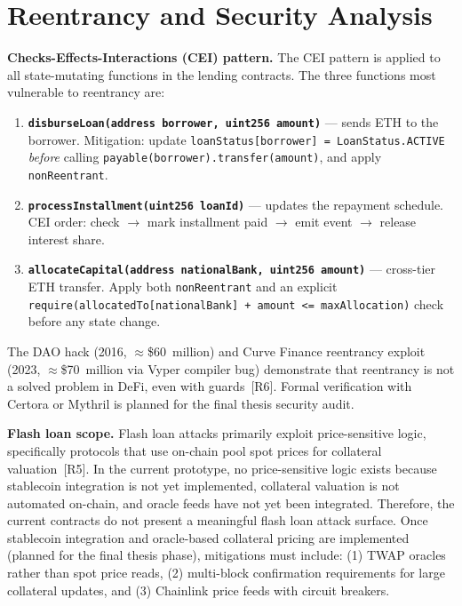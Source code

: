 \documentclass[12pt,a4paper]{report}
\begin{document}
\section{Reentrancy and Security Analysis}

\textbf{Checks-Effects-Interactions (CEI) pattern.} The CEI pattern is applied to all state-mutating functions in the lending contracts. The three functions most vulnerable to reentrancy are:

\begin{enumerate}[noitemsep]
\item \textbf{\texttt{disburseLoan(address borrower, uint256 amount)}} --- sends ETH to the borrower. Mitigation: update \texttt{loanStatus[borrower] = LoanStatus.ACTIVE} \emph{before} calling \texttt{payable(borrower).transfer(amount)}, and apply \texttt{nonReentrant}.
\item \textbf{\texttt{processInstallment(uint256 loanId)}} --- updates the repayment schedule. CEI order: check $\to$ mark installment paid $\to$ emit event $\to$ release interest share.
\item \textbf{\texttt{allocateCapital(address nationalBank, uint256 amount)}} --- cross-tier ETH transfer. Apply both \texttt{nonReentrant} and an explicit \texttt{require(allocatedTo[nationalBank] + amount <= maxAllocation)} check before any state change.
\end{enumerate}

The DAO hack (2016, $\approx$\$60~million) and Curve Finance reentrancy exploit (2023, $\approx$\$70~million via Vyper compiler bug) demonstrate that reentrancy is not a solved problem in DeFi, even with guards~[R6]. Formal verification with Certora or Mythril is planned for the final thesis security audit.

\textbf{Flash loan scope.} Flash loan attacks primarily exploit price-sensitive logic, specifically protocols that use on-chain pool spot prices for collateral valuation~[R5]. In the current prototype, no price-sensitive logic exists because stablecoin integration is not yet implemented, collateral valuation is not automated on-chain, and oracle feeds have not yet been integrated. Therefore, the current contracts do not present a meaningful flash loan attack surface. Once stablecoin integration and oracle-based collateral pricing are implemented (planned for the final thesis phase), mitigations must include: (1) TWAP oracles rather than spot price reads, (2) multi-block confirmation requirements for large collateral updates, and (3) Chainlink price feeds with circuit breakers.
\end{document}
